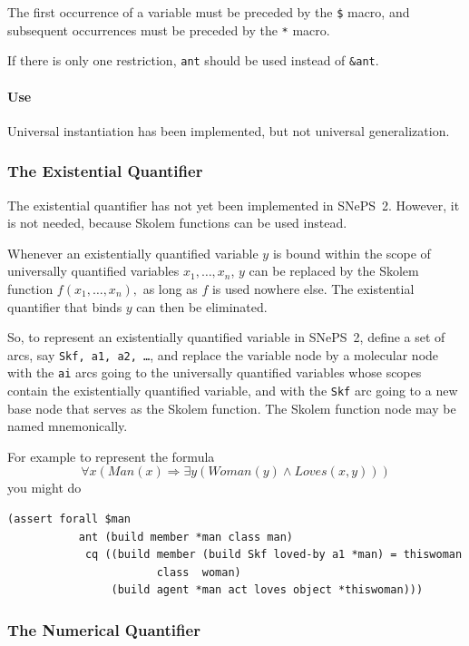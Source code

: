 \documentclass{book}
\begin{document}
The first occurrence of a variable must be preceded by the \verb|$| macro, and subsequent occurrences must
be preceded by the \verb|*| macro.

If there is only one restriction, {\tt ant} should be used instead of {\tt \&ant}.

\paragraph{Use}
Universal instantiation has been implemented, but not universal generalization.

\subsubsection{The Existential Quantifier}

The existential quantifier has not yet been implemented in SNePS~2.
However, it is not needed, because Skolem functions can be used
instead.

Whenever an existentially quantified variable $y$ is bound within the
scope of universally quantified variables $x_1, \ldots, x_n$, $y$ can be
replaced by the Skolem function $f(x_1, \ldots, x_n),$ as long as $f$
is used nowhere else.  The existential quantifier that binds $y$ can
then be eliminated.

So, to represent an existentially quantified variable in SNePS~2,
define a set of arcs, say {\tt Skf, a1, a2, \ldots}, and replace the
variable node by a molecular node with the {\tt ai} arcs going to the
universally quantified variables whose scopes contain the
existentially quantified variable, and with the {\tt Skf} arc going to
a new base node that serves as the Skolem function.  The Skolem
function node may be named mnemonically.

For example to represent the formula
$$\forall x (Man(x) \Rightarrow \exists y (Woman(y) \wedge Loves(x,y)))$$
you might do
\begin{verbatim}
(assert forall $man
           ant (build member *man class man)
            cq ((build member (build Skf loved-by a1 *man) = thiswoman
                       class  woman)
                (build agent *man act loves object *thiswoman)))
\end{verbatim}


\subsubsection{The Numerical Quantifier}
\end{document}
